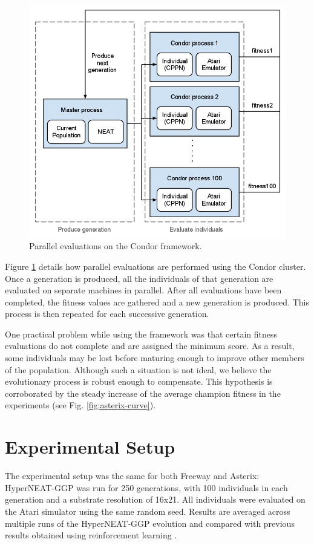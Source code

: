 \documentclass{acm_proc_article-sp}
\begin{document}
\begin{figure}[ht]
\begin{center}
\includegraphics[width=\columnwidth]{figures/condor-hyperneat-small.png}
\end{center}
\caption{Parallel evaluations on the Condor framework.}
\label{fig:condor}
\end{figure}

Figure \ref{fig:condor} details how parallel evaluations are performed using the Condor cluster. Once a generation is produced, all the individuals of that generation are evaluated on separate machines in parallel. After all evaluations have been completed, the fitness values are gathered and a new generation is produced. This process is then repeated for each successive generation. 

One practical problem while using the framework was that certain fitness evaluations do not complete and are assigned the minimum score. As a result, some individuals may be lost before maturing enough to improve other members of the population. Although such a situation is not ideal, we believe the evolutionary process is robust enough to compensate. This hypothesis is corroborated by the steady increase of the average champion fitness in the experiments (see Fig. \ref{fig:asterix-curve}). 

\section{Experimental Setup}
\label{sec:exprsetup}
The experimental setup was the same for both Freeway and Asterix: HyperNEAT-GGP was run for 250 generations, with 100 individuals in each generation and a substrate resolution of 16x21. All individuals were evaluated on the Atari simulator using the same random seed. Results are averaged across multiple runs of the HyperNEAT-GGP evolution and compared with previous results obtained using reinforcement learning \cite{naddaf10}. 
\end{document}
